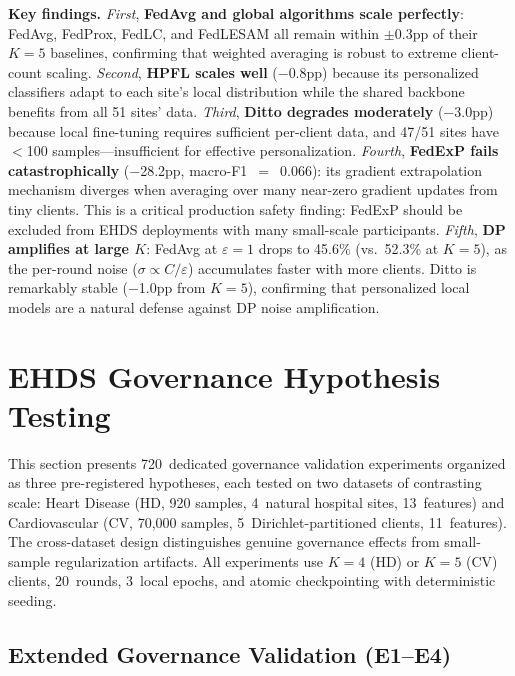 \documentclass[conference]{IEEEtran}
\begin{document}
\textbf{Key findings.} \textit{First}, \textbf{FedAvg and global algorithms scale perfectly}: FedAvg, FedProx, FedLC, and FedLESAM all remain within $\pm$0.3pp of their $K{=}5$ baselines, confirming that weighted averaging is robust to extreme client-count scaling. \textit{Second}, \textbf{HPFL scales well} ($-$0.8pp) because its personalized classifiers adapt to each site's local distribution while the shared backbone benefits from all 51 sites' data. \textit{Third}, \textbf{Ditto degrades moderately} ($-$3.0pp) because local fine-tuning requires sufficient per-client data, and 47/51 sites have $<$100 samples---insufficient for effective personalization. \textit{Fourth}, \textbf{FedExP fails catastrophically} ($-$28.2pp, macro-F1~$=$~0.066): its gradient extrapolation mechanism diverges when averaging over many near-zero gradient updates from tiny clients. This is a critical production safety finding: FedExP should be excluded from EHDS deployments with many small-scale participants. \textit{Fifth}, \textbf{DP amplifies at large $K$}: FedAvg at $\varepsilon{=}1$ drops to 45.6\% (vs.\ 52.3\% at $K{=}5$), as the per-round noise ($\sigma \propto C/\varepsilon$) accumulates faster with more clients. Ditto is remarkably stable ($-$1.0pp from $K{=}5$), confirming that personalized local models are a natural defense against DP noise amplification.


\section{EHDS Governance Hypothesis Testing}
\label{app:governance}
\label{sec:governance_hypotheses}

This section presents 720~dedicated governance validation experiments organized as three pre-registered hypotheses, each tested on two datasets of contrasting scale: Heart Disease (HD, 920 samples, 4~natural hospital sites, 13~features) and Cardiovascular (CV, 70,000 samples, 5~Dirichlet-partitioned clients, 11~features). The cross-dataset design distinguishes genuine governance effects from small-sample regularization artifacts. All experiments use $K{=}4$ (HD) or $K{=}5$ (CV) clients, 20~rounds, 3~local epochs, and atomic checkpointing with deterministic seeding.

\subsection{Extended Governance Validation (E1--E4)}
\label{sec:governance_e1e4}
\end{document}
